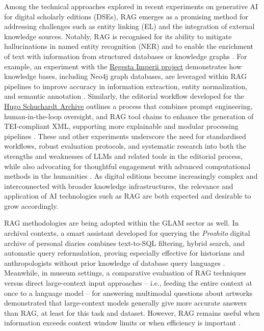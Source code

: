 \begin{spacing}{1.5}
Among the technical approaches explored in recent experiments on generative AI for digital scholarly editions (DSEs), RAG emerges as a promising method for addressing challenges such as entity linking (EL) and the integration of external knowledge sources. Notably, RAG is recognised for its ability to mitigate hallucinations in named entity recognition (NER) and to enable the enrichment of text with information from structured databases or knowledge graphs \citep{pollin_when_2025}. For example, an experiment with the \href{https://www.regesta-imperii.de/en/home.html}{Regesta Imperii project} \parencite{noauthor_home_nodate} demonstrates how knowledge bases, including Neo4j graph databases, are leveraged within RAG pipelines to improve accuracy in information extraction, entity normalization, and semantic annotation \citep{kuczera_chatgpt_2024}. Similarly, the editorial workflow developed for the \href{https://web.archive.org/web/20241120122545/https://gams.uni-graz.at/context:hsa}{Hugo Schuchardt Archive} \citep{hurch_hsa_2024} outlines a process that combines prompt engineering, human-in-the-loop oversight, and RAG tool chains to enhance the generation of TEI-compliant XML, supporting more explainable and modular processing pipelines \citep{pollin_new_2023}. These and other experiments underscore the need for standardised workflows, robust evaluation protocols, and systematic research into both the strengths and weaknesses of LLMs and related tools in the editorial process, while also advocating for thoughtful engagement with advanced computational methods in the humanities \citep{pollin_workshop_2024}. As digital editions become increasingly complex and interconnected with broader knowledge infrastructures, the relevance and application of AI technologies such as RAG are both expected and desirable to grow accordingly.

RAG methodologies are being adopted within the GLAM sector as well. In archival contexts, a smart assistant developed for querying the \textit{Prozhito} digital archive of personal diaries combines text-to-SQL filtering, hybrid search, and automatic query reformulation, proving especially effective for historians and anthropologists without prior knowledge of database query languages  \citep{sergeev_talking_2025}. Meanwhile, in museum settings, a comparative evaluation of RAG techniques versus direct large-context input approaches -- i.e., feeding the entire context at once to a language model -- for answering multimodal questions about artworks demonstrated that large-context models generally give more accurate answers than RAG, at least for this task and dataset. However, RAG remains useful when information exceeds context window limits or when efficiency is important \citep{ramos-varela_context_2025}.


\end{spacing}
